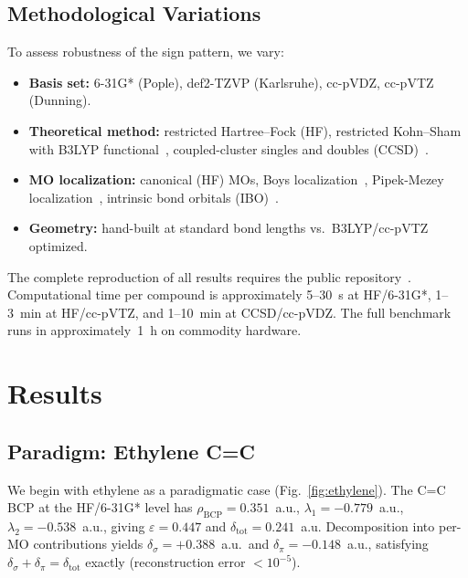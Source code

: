 \documentclass[11pt,a4paper]{article}
\newcommand{\delsg}{\delta_{\sigma}}
\newcommand{\delpi}{\delta_{\pi}}
\newcommand{\eps}{\varepsilon}
\begin{document}
\subsection{Methodological Variations}

To assess robustness of the sign pattern, we vary:

\begin{itemize}
\item \textbf{Basis set:} 6-31G* (Pople), def2-TZVP (Karlsruhe),
cc-pVDZ, cc-pVTZ (Dunning).
\item \textbf{Theoretical method:} restricted Hartree--Fock (HF),
restricted Kohn--Sham with B3LYP functional~\citep{Becke1993,Stephens1994},
coupled-cluster singles and doubles (CCSD)~\citep{Purvis1982}.
\item \textbf{MO localization:} canonical (HF) MOs, Boys
localization~\citep{Boys1960}, Pipek-Mezey
localization~\citep{Pipek1989}, intrinsic bond
orbitals (IBO)~\citep{Knizia2013}.
\item \textbf{Geometry:} hand-built at standard bond lengths vs.\
B3LYP/cc-pVTZ optimized.
\end{itemize}

The complete reproduction of all results requires the public
repository~\citep{Zhou2026code,Zhou2026data}. Computational time
per compound is approximately 5--30~s at HF/6-31G*, 1--3~min at
HF/cc-pVTZ, and 1--10~min at CCSD/cc-pVDZ. The full benchmark
runs in approximately~1~h on commodity hardware.

\section{Results}
\label{sec:results}

\subsection{Paradigm: Ethylene C=C}
\label{sec:results_ethylene}

We begin with ethylene as a paradigmatic case (Fig.~\ref{fig:ethylene}). The C=C BCP at the
HF/6-31G* level has $\rho_{\text{BCP}} = 0.351$~a.u.,
$\lambda_1 = -0.779$~a.u., $\lambda_2 = -0.538$~a.u.,
giving $\eps = 0.447$ and $\delta_{\text{tot}} = 0.241$~a.u.
Decomposition into per-MO contributions yields $\delsg = +0.388$~a.u.\
and $\delpi = -0.148$~a.u., satisfying $\delsg + \delpi = \delta_{\text{tot}}$
exactly (reconstruction error $< 10^{-5}$).
\end{document}
